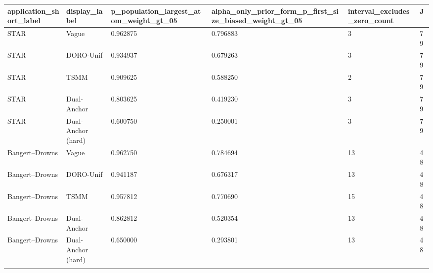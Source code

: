\begin{longtable}{llllll}
\toprule
application\_short\_label & display\_label & p\_population\_largest\_atom\_weight\_gt\_05 & alpha\_only\_prior\_form\_p\_first\_size\_biased\_weight\_gt\_05 & interval\_excludes\_zero\_count & J \\
\midrule\endhead
STAR & Vague & 0.962875 & 0.796883 & 3 & 79 \\ \addlinespace[3pt]
STAR & DORO-Unif & 0.934937 & 0.679263 & 3 & 79 \\ \addlinespace[3pt]
STAR & TSMM & 0.909625 & 0.588250 & 2 & 79 \\ \addlinespace[3pt]
STAR & Dual-Anchor & 0.803625 & 0.419230 & 3 & 79 \\ \addlinespace[3pt]
STAR & Dual-Anchor (hard) & 0.600750 & 0.250001 & 3 & 79 \\ \addlinespace[3pt]
Bangert--Drowns & Vague & 0.962750 & 0.784694 & 13 & 48 \\ \addlinespace[3pt]
Bangert--Drowns & DORO-Unif & 0.941187 & 0.676317 & 13 & 48 \\ \addlinespace[3pt]
Bangert--Drowns & TSMM & 0.957812 & 0.770690 & 15 & 48 \\ \addlinespace[3pt]
Bangert--Drowns & Dual-Anchor & 0.862812 & 0.520354 & 13 & 48 \\ \addlinespace[3pt]
Bangert--Drowns & Dual-Anchor (hard) & 0.650000 & 0.293801 & 13 & 48 \\ \addlinespace[3pt]
\bottomrule\end{longtable}
